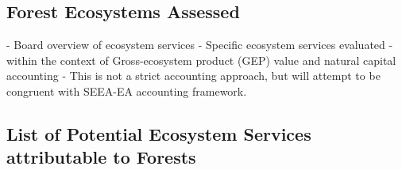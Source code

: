 \documentclass[11pt]{article}
\begin{document}
\subsection{Forest Ecosystems Assessed}

- Board overview of ecosystem services 
- Specific ecosystem services evaluated 
- within the context of Gross-ecosystem product (GEP) value and natural capital accounting
- This is not a strict accounting approach, but will attempt to be congruent with SEEA-EA accounting framework.


\subsection{List of Potential Ecosystem Services attributable to Forests}
\end{document}
